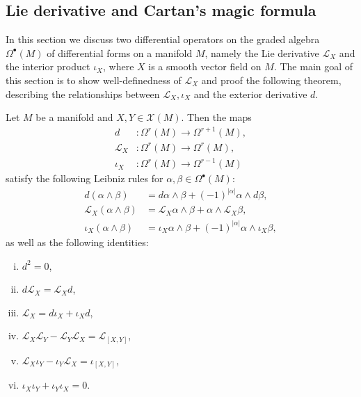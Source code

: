 \subsection{Lie derivative and Cartan's magic formula}
In this section we discuss two differential operators on the graded algebra $\Omega^\bullet(M)$ of differential forms on a manifold $M$, namely the Lie derivative $\mathcal{L}_X$ and the interior product $\iota_X$, where $X$ is a smooth vector field on $M$. The main goal of this section is to show well-definedness of $\mathcal{L}_X$ and proof the following theorem, describing the relationships between $\mathcal{L}_X, \iota_X$ and the exterior derivative $d$.

\begin{theorem}
    \label{thm:cartan_calculus}
    Let $M$ be a manifold and $X,Y \in \mathscr{X}(M)$. Then the maps
    \begin{align*}
        d &\colon \Omega^r(M) \to \Omega^{r+1}(M), \\
        \mathcal{L}_X &\colon \Omega^r(M) \to \Omega^r(M), \\
        \iota_X &\colon \Omega^r(M) \to \Omega^{r-1}(M)
    \end{align*}
    satisfy the following Leibniz rules for $\alpha, \beta \in \Omega^\bullet(M)$:
    \begin{align*}
        d(\alpha \wedge \beta) &= d\alpha \wedge \beta + (-1)^{|\alpha|} \alpha \wedge d\beta, \\
        \mathcal{L}_X(\alpha \wedge \beta) &= \mathcal{L}_X\alpha \wedge \beta +  \alpha \wedge \mathcal{L}_X\beta, \\
        \iota_X(\alpha \wedge \beta) &= \iota_X\alpha \wedge \beta + (-1)^{|\alpha|} \alpha \wedge \iota_X\beta,
    \end{align*}
    as well as the following identities:
    \begin{enumerate}[(i)]
        \item $d^2 = 0$, \label{eq:cartan1}
        \item $d\mathcal{L}_X = \mathcal{L}_Xd$,\label{eq:cartan2}
        \item $\mathcal{L}_X = d\iota_X + \iota_Xd$,\label{eq:cartan3}
        \item $\mathcal{L}_X\mathcal{L}_Y - \mathcal{L}_Y\mathcal{L}_X = \mathcal{L}_{[X,Y]}$,\label{eq:cartan4}
        \item $\mathcal{L}_X\iota_Y - \iota_Y\mathcal{L}_X = \iota_{[X,Y]}$,\label{eq:cartan5}
        \item $\iota_X\iota_Y + \iota_Y\iota_X = 0$.\label{eq:cartan6}
    \end{enumerate}
\end{theorem}

